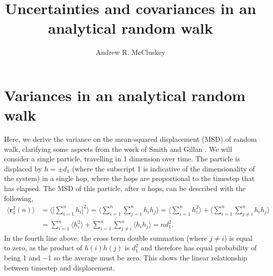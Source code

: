 \documentclass[reprint,superscriptaddress,nobibnotes,amsmath,amssymb,aps,onecolumn]{revtex4-2}
\begin{document}
\title{Uncertainties and covariances in an analytical random walk}

\author{Andrew R. McCluskey}

\maketitle 

\section{Variances in an analytical random walk}
\label{sec:ran}

Here, we derive the variance on the mean-squared displacement (MSD) of random walk, clarifying some aspects from the work of Smith and Gillan \cite{smith_random_1996}.
We will consider a single particle, travelling in \num{1} dimension over time.
The particle is displaced by $h = \pm d_{1}$ (where the subscript \num{1} is indicative of the dimensionality of the system) in a single hop, where the hops are proportional to the timestep that has elapsed.
The MSD of this particle, after $n$ hops, can be described with the following,
%
\begin{equation}
    \begin{aligned}
        \langle \mathbf{r}_1^2(n) \rangle & = \Bigg\langle \bigg[ \sum_{i=1}^{n} h_i \bigg]^2 \Bigg\rangle = \Bigg\langle \sum_{i=1}^{n} \sum_{j=1}^{n} h_i h_j \Bigg\rangle = \Bigg\langle \sum_{i=1}^{n} h_i^2 \Bigg\rangle + \Bigg\langle \sum_{i=1}^{n} \sum_{j \neq i}^{n} h_i h_j \Bigg\rangle \\
        & = \sum_{i=1}^{n} \big\langle h_i^2 \big\rangle + \sum_{i=1}^{n} \sum_{j \neq i}^{n} \big\langle h_i h_j \big\rangle = n d_1^2.
    \end{aligned}
\end{equation}
%
In the fourth line above, the cross term double summation (where $j \neq i$) is equal to zero, as the product of $h(i)h(j)$ is $d_1^2$ and therefore has equal probability of being \num{+1} and \num{-1} so the average must be zero.
This  shows the linear relationship between timestep and displacement.
\end{document}
